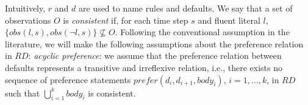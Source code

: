 \documentclass{article}
\begin{document}
Intuitively, $r$ and $d$ are used to name rules and defaults. 
%
We say that a set of observations $O$ is \emph{consistent} if, for each time step $s$ and fluent literal $l$, $\{obs(l,s), obs(\neg l, s)\} \not\subseteq O$. 
Following the conventional assumption in the literature, we will make the following assumptions about the preference relation in $RD$: 
\emph{acyclic preference}: we assume that the preference relation between defaults represents a transitive and irreflexive relation, i.e., there exists no sequence of preference statements $prefer(d_i, d_{i+1}, body_i)$, $i=1,\ldots,k$, in $RD$ such that $\bigcup_{i=1}^k body_i$  is consistent. 

\end{document}
